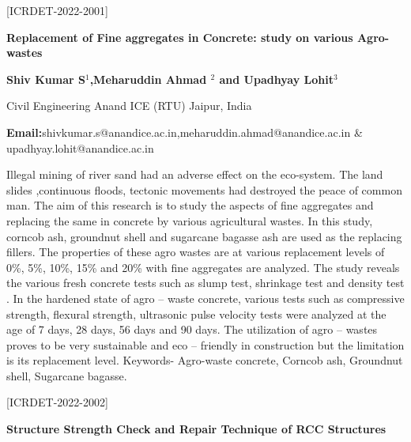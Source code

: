\documentclass[twoside,11pt]{amsart}
\begin{document}
\vskip 5mm
\begin{flushleft}
\centerline{[ICRDET-2022-2001]}
\end{flushleft}
\begin{center}\bf\LARGE
Replacement of Fine aggregates in Concrete: study on various Agro-wastes
\end{center}
\vskip 5mm

\centerline{\textbf{Shiv Kumar S$^{1}$,Meharuddin Ahmad
$^{2}$ and Upadhyay Lohit$^{3}$  }}
\vskip 5mm
\begin{flushleft}
Civil Engineering
Anand ICE
(RTU)
Jaipur, India
\vskip 5mm
\end{flushleft}
\vskip 2mm
\begin{flushleft}
{\bf Email:}shivkumar.s@anandice.ac.in,meharuddin.ahmad@anandice.ac.in \& upadhyay.lohit@anandice.ac.in
\end{flushleft}
\vskip 5mm
Illegal mining of river sand had an adverse effect on the eco-system. The land slides ,continuous
floods, tectonic movements had destroyed the peace of common man. The aim of this research is to study
the aspects of fine aggregates and replacing the same in concrete by various agricultural wastes. In this
study, corncob ash, groundnut shell and sugarcane bagasse ash are used as the replacing fillers. The
properties of these agro wastes are at various replacement levels of 0\%, 5\%, 10\%, 15\% and 20\% with
fine aggregates are analyzed. The study reveals the various fresh concrete tests such as slump test,
shrinkage test and density test . In the hardened state of agro – waste concrete, various tests such as
compressive strength, flexural strength, ultrasonic pulse velocity tests were analyzed at the age of 7 days,
28 days, 56 days and 90 days. The utilization of agro – wastes proves to be very sustainable and eco –
friendly in construction but the limitation is its replacement level.
Keywords- Agro-waste concrete, Corncob ash, Groundnut shell, Sugarcane bagasse.
\newpage
\vskip 5mm
\begin{flushleft}
\centerline{[ICRDET-2022-2002]}
\end{flushleft}
\begin{center}\bf\LARGE
Structure Strength Check and Repair Technique of
RCC Structures
\end{center}
\vskip 5mm
\end{document}
